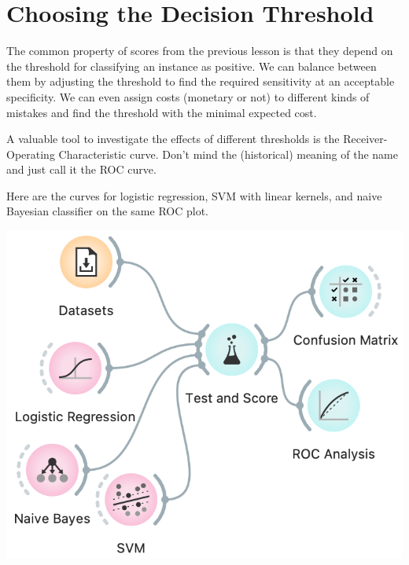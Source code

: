 \chapter{Choosing the Decision Threshold}
\label{ch:p-thresholds}

The common property of scores from the previous lesson is that they depend on the threshold for classifying an instance as positive. We can balance between them by adjusting the threshold to find the required sensitivity at an acceptable specificity. We can even assign costs (monetary or not) to different kinds of mistakes and find the threshold with the minimal expected cost.

A valuable tool to investigate the effects of different thresholds is the Receiver-Operating Characteristic curve. Don’t mind the (historical) meaning of the name and just call it the ROC curve.

Here are the curves for logistic regression, SVM with linear kernels, and naive Bayesian classifier on the same ROC plot.

\begin{marginfigure}
    \includegraphics[scale=0.4]{roc-workflow.png}
    \caption{$\;$}
\end{marginfigure}

